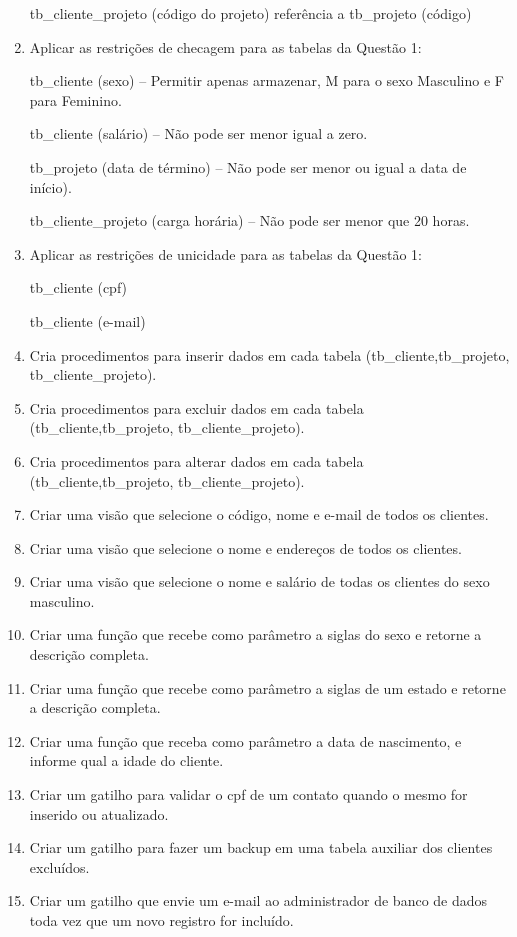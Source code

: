 \documentclass[11pt]{article}
\begin{document}
\begin{enumerate}
		tb\_cliente\_projeto (código do projeto) referência a tb\_projeto (código)
		
		\item Aplicar as restrições de checagem para as tabelas da Questão 1:
		
		tb\_cliente (sexo) – Permitir apenas armazenar, M para o sexo Masculino e F para Feminino.
		
		tb\_cliente (salário) – Não pode ser menor igual a zero.
		
		tb\_projeto (data de término) – Não pode ser menor ou igual a data de início).
		
		tb\_cliente\_projeto (carga horária) – Não pode ser menor que 20 horas.
		
		\item Aplicar as restrições de unicidade para as tabelas da Questão 1:
		
		tb\_cliente (cpf)
		
		tb\_cliente (e-mail)
		
		\item Cria procedimentos para inserir dados em cada tabela (tb\_cliente,tb\_projeto, tb\_cliente\_projeto).
		
		\item Cria procedimentos para excluir dados em cada tabela (tb\_cliente,tb\_projeto, tb\_cliente\_projeto).
		
		\item Cria procedimentos para alterar dados em cada tabela (tb\_cliente,tb\_projeto, tb\_cliente\_projeto).
		
		\item Criar uma visão que selecione o código, nome e e-mail de todos os clientes.
		
		\item Criar uma visão que selecione o nome e endereços de todos os clientes.
		
		\item Criar uma visão que selecione o nome e salário de todas os clientes do sexo masculino.
		
		\item Criar uma função que recebe como parâmetro a siglas do sexo e retorne a descrição completa.
		
		\item Criar uma função que recebe como parâmetro a siglas de um estado e retorne a descrição completa.
		
		\item Criar uma função que receba como parâmetro a data de nascimento, e informe qual a idade do cliente.
		
		\item Criar um gatilho para validar o cpf de um contato quando o mesmo for inserido ou atualizado.
		
		\item Criar um gatilho para fazer um backup em uma tabela auxiliar dos clientes excluídos.
		
		\item Criar um gatilho que envie um e-mail ao administrador de banco de dados toda vez que um novo registro for incluído.
	\end{enumerate}
	
\end{document}
